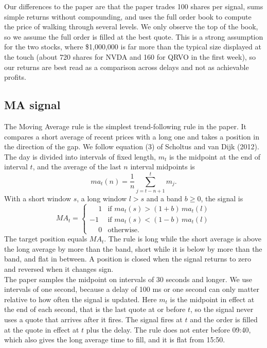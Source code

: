 \documentclass{article}
\begin{document}
\noindent Our differences to the paper are that the paper trades 100 shares per signal, sums simple returns without compounding, and uses the full order book to compute the price of walking through several levels. We only observe the top of the book, so we assume the full order is filled at the best quote. This is a strong assumption for the two stocks, where \$1,000,000 is far more than the typical size displayed at the touch (about 720 shares for NVDA and 160 for QRVO in the first week), so our returns are best read as a comparison across delays and not as achievable profits.


\subsection{MA signal}

The Moving Average rule is the simplest trend-following rule in the paper. It compares a short average of recent prices with a long one and takes a position in the direction of the gap. We follow equation (3) of Scholtus and van Dijk (2012). The day is divided into intervals of fixed length, $m_t$ is the midpoint at the end of interval $t$, and the average of the last $n$ interval midpoints is
\begin{equation}
ma_t(n) = \frac{1}{n} \sum_{j=t-n+1}^{t} m_j .
\end{equation}
With a short window $s$, a long window $l > s$ and a band $b \ge 0$, the signal is
\begin{equation}
MA_t =
\begin{cases}
\phantom{-}1 & \text{if } ma_t(s) > (1+b)\, ma_t(l) \\
-1 & \text{if } ma_t(s) < (1-b)\, ma_t(l) \\
\phantom{-}0 & \text{otherwise.}
\end{cases}
\end{equation}
The target position equals $MA_t$. The rule is long while the short average is above the long average by more than the band, short while it is below by more than the band, and flat in between. A position is closed when the signal returns to zero and reversed when it changes sign.\\

\noindent The paper samples the midpoint on intervals of 30 seconds and longer. We use intervals of one second, because a delay of 100 ms or one second can only matter relative to how often the signal is updated. Here $m_t$ is the midpoint in effect at the end of each second, that is the last quote at or before $t$, so the signal never uses a quote that arrives after it fires. The signal fires at $t$ and the order is filled at the quote in effect at $t$ plus the delay. The rule does not enter before 09:40, which also gives the long average time to fill, and it is flat from 15:50.\\
\end{document}
